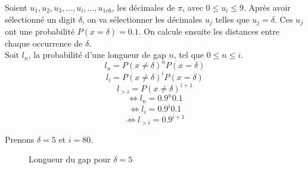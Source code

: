 \documentclass[10pt,a4paper]{article}
\begin{document}
Soient $u_1, u_2, u_3, ..., u_i, ..., u_{1e6}$, les décimales de $\pi$, avec $0 \leq u_i \leq 9$. Après avoir sélectionné un digit $\delta$, on va sélectionner les décimales $u_j$ telles que $u_j = \delta$. Ces $u_j$ ont une probabilité $P(x=\delta) = 0.1$. On calcule ensuite les distances entre chaque occurrence de $\delta$.\\ Soit $l_n$, la probabilité d'une longueur de gap $n$, tel que $0 \leq n \leq i$.
\[l_n = P(x \neq \delta)^n P(x=\delta)\]
\[l_i = P(x \neq \delta)^i P(x=\delta)\]
\[l_{>i} = P(x \neq \delta)^{i+1}\]
\[\Leftrightarrow l_n = 0.9^n0.1\]
\[\Leftrightarrow l_i = 0.9^i0.1\]
\[\Leftrightarrow l_{>i} = 0.9^{i+1}\]

Prenons $\delta = 5$ et $i=80$.


\begin{figure}[H]
\caption{Longueur du gap pour $\delta = 5$}
\label{khi2histo}
\end{figure}
\end{document}
